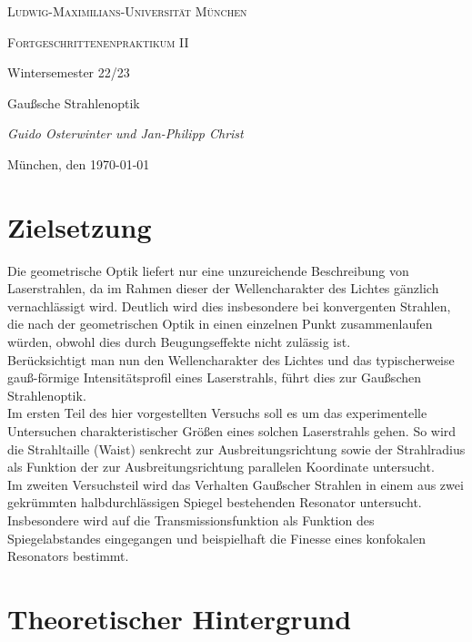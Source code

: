 \documentclass[11pt,a4paper,oneside]{scrartcl}
\begin{document}
\begin{titlepage}
	\centering
	{\scshape\LARGE Ludwig-Maximilians-Universität \linebreak München \par}
	\vspace{1cm}
	{\scshape\Large Fortgeschrittenenpraktikum II \par Wintersemester 22/23 \par}
	\vspace{1.5cm}
	{\huge\bfseries \par  Gaußsche Strahlenoptik\par}
	\vspace{2cm}
	{\Large\itshape Guido Osterwinter und Jan-Philipp Christ \par}
	\vfill
	{\large München, den \today\par}
\end{titlepage}

\tableofcontents
\newpage
\section{Zielsetzung}
Die geometrische Optik liefert nur eine unzureichende Beschreibung von Laserstrahlen, da im Rahmen dieser der Wellencharakter des Lichtes gänzlich vernachlässigt wird. Deutlich wird dies insbesondere bei konvergenten Strahlen, die nach der geometrischen Optik in einen einzelnen Punkt zusammenlaufen würden, obwohl dies durch Beugungseffekte nicht zulässig ist. \\
Berücksichtigt man nun den Wellencharakter des Lichtes und das typischerweise gauß-förmige Intensitätsprofil eines Laserstrahls, führt dies zur Gaußschen Strahlenoptik. \\
Im ersten Teil des hier vorgestellten Versuchs soll es um das experimentelle Untersuchen charakteristischer Größen eines solchen Laserstrahls gehen. So wird die Strahltaille (Waist) senkrecht zur Ausbreitungsrichtung sowie der Strahlradius als Funktion der zur Ausbreitungsrichtung parallelen Koordinate untersucht.\\
Im zweiten Versuchsteil wird das Verhalten Gaußscher Strahlen in einem aus zwei gekrümmten halbdurchlässigen Spiegel bestehenden Resonator untersucht. Insbesondere wird auf die Transmissionsfunktion als Funktion des Spiegelabstandes eingegangen und beispielhaft die Finesse eines konfokalen Resonators bestimmt. 
\section{Theoretischer Hintergrund}
\end{document}
